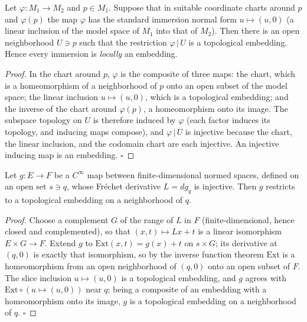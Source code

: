 \begin{lemma}
  \label{lem:dc-ch0-3-7-embedding}
  \leanok
  Let $\varphi:M_1\to M_2$ and $p\in M_1$. Suppose that in suitable coordinate charts
  around $p$ and $\varphi(p)$ the map $\varphi$ has the standard immersion normal form
  $u\mapsto(u,0)$ (a linear inclusion of the model space of $M_1$ into that of $M_2$).
  Then there is an open neighborhood $U\ni p$ such that the restriction $\varphi\,|\,U$ is
  a topological embedding. Hence every immersion is \emph{locally} an embedding.
\end{lemma}
\begin{proof}
  \sketch
  \leanok
  In the chart around $p$, $\varphi$ is the composite of three maps: the chart, which is a
  homeomorphism of a neighborhood of $p$ onto an open subset of the model space; the linear
  inclusion $u\mapsto(u,0)$, which is a topological embedding; and the inverse of the chart
  around $\varphi(p)$, a homeomorphism onto its image. The subspace topology on $U$ is
  therefore induced by $\varphi$ (each factor induces its topology, and inducing maps
  compose), and $\varphi\,|\,U$ is injective because the chart, the linear inclusion, and
  the codomain chart are each injective. An injective inducing map is an embedding. $\square$
\end{proof}

\begin{lemma}
  \label{lem:dc-ch0-3-7-normalform}
  \leanok
  Let $g:E\to F$ be a $C^\infty$ map between finite-dimensional normed spaces, defined on an
  open set $s\ni q$, whose Fréchet derivative $L=dg_q$ is injective. Then $g$ restricts to a
  topological embedding on a neighborhood of $q$.
\end{lemma}
\begin{proof}
  \sketch
  \leanok
  Choose a complement $G$ of the range of $L$ in $F$ (finite-dimensional, hence closed and
  complemented), so that $(x,t)\mapsto Lx+t$ is a linear isomorphism $E\times G\to F$. Extend
  $g$ to $\mathrm{Ext}(x,t)=g(x)+t$ on $s\times G$; its derivative at $(q,0)$ is exactly that
  isomorphism, so by the inverse function theorem $\mathrm{Ext}$ is a homeomorphism from an
  open neighborhood of $(q,0)$ onto an open subset of $F$. The slice inclusion
  $u\mapsto(u,0)$ is a topological embedding, and $g$ agrees with $\mathrm{Ext}\circ(u\mapsto(u,0))$
  near $q$; being a composite of an embedding with a homeomorphism onto its image, $g$ is a
  topological embedding on a neighborhood of $q$. $\square$
\end{proof}

